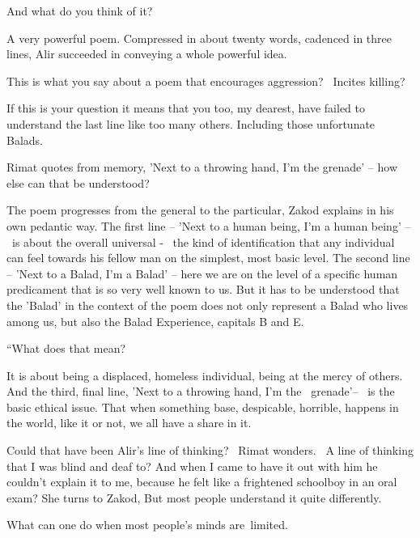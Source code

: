 \documentclass[letterpaper]{article}
\begin{document}
{\textquotedbl}And what do you think of it?{\textquotedbl} 

{\textquotedbl}A very powerful poem. Compressed in about twenty words, cadenced in three lines, Alir succeeded in
conveying a whole powerful idea.{\textquotedbl}~ 

{\textquotedbl}This is what you say about a poem that encourages aggression? ~Incites killing?{\textquotedbl} 

{\textquotedbl}If this is your question it means that you too, my dearest, have failed to understand the last line like
too many others. Including those unfortunate Balads.{\textquotedbl} 

Rimat quotes from memory, 'Next to a throwing hand, I'm the grenade' -- how else can that be understood?{\textquotedbl} 

{\textquotedbl}The poem progresses from the general to the particular,{\textquotedbl} Zakod explains in his own pedantic
way. {\textquotedbl}The first line -- 'Next to a human being, I'm a human being' --~is about the overall universal -
\ the kind of identification that any individual can feel towards his fellow man on the simplest, most basic level. The
second line -- 'Next to a Balad, I'm a Balad' -- here we are on the level of a specific human predicament that is so
very well known to us. But it has to be understood that the 'Balad' in the context of the poem does not only represent
a Balad who lives among us, but also the Balad Experience, capitals B and E.{\textquotedbl}{ }

{}``What does that mean?{\textquotedbl} 

{\textquotedbl}It is about being a displaced, homeless individual, being at the mercy of others. And the third, final
line, 'Next to a throwing hand, I'm the~ grenade'--~ is the basic ethical issue. That when something base, despicable,
horrible, happens in the world, like it or not, we all have a share in
it.{\textquotedbl}\textcolor[rgb]{0.0,0.6901961,0.9411765}{ }

Could that have been Alir's line of thinking? \ Rimat wonders. \ A line of thinking that I was blind and deaf to? And
when I came to have it out with him he couldn't explain it to me, because he felt like a frightened schoolboy in an
oral exam? She turns to\textcolor[rgb]{0.0,0.6901961,0.9411765}{ }Zakod, {\textquotedbl}But most people understand it
quite differently.{\textquotedbl} 

{\textquotedbl}What can one do when most people's minds are~limited.{\textquotedbl} 
\end{document}

